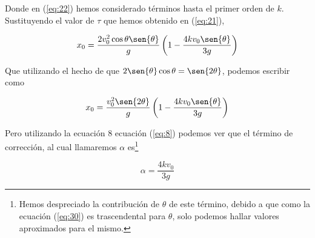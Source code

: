 \documentclass[a4paper,10pt]{article}
\numberwithin{equation}{section}
\begin{document}
Donde en (\ref{eq:22}) hemos considerado términos hasta el primer orden de $k$. 
Sustituyendo el valor de $\tau$ que hemos obtenido en (\ref{eq:21}), 

\begin{equation}
 x_0 = \frac{2 v_0^2 \cos{\theta} \sen{\theta} }{g}\left(1 - \frac{4k v_0 \sen{\theta} }{3g} \right)
\end{equation}

Que utilizando el hecho de que $2\sen{\theta}\cos{\theta} = \sen{2\theta}$, podemos
escribir como

\begin{equation}
 x_0 = \frac{v_0^2 \sen{2\theta}}{g}\left(1 - \frac{4k v_0 \sen{\theta} }{3g} \right)
 \label{eq:30}
\end{equation}

% 
% 
% 

Pero utilizando la ecuación 8 ecuación (\ref{eq:8}) podemos ver que el término de
corrección, al cual llamaremos $\alpha$ es\footnote{Hemos despreciado la contribución de 
$\theta$ de este término, debido a que como la ecuación (\ref{eq:30}) es trascendental para
$\theta$, solo podemos hallar valores aproximados para el mismo.}

\begin{equation}
  \alpha = \frac{4k v_0 }{3g}
\end{equation}
\end{document}
